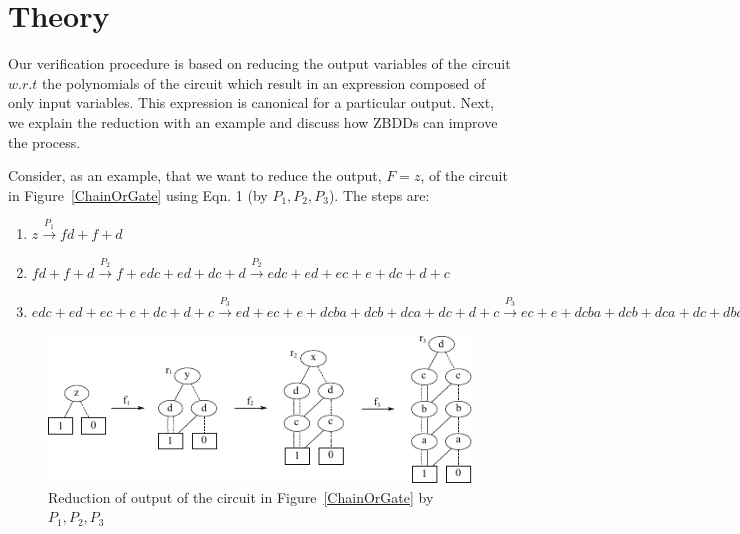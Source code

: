 \documentclass{article}
\theoremstyle{definition}
\begin{document}
\section{Theory}

Our verification procedure is based on reducing the output variables of the circuit $w.r.t$ the polynomials of the circuit which result in an expression composed of only input variables. This expression is canonical for a particular output. Next, we explain the reduction with an example and discuss how ZBDDs can improve the process.
\par
Consider, as an example, that we want to reduce the output, $F=z$, of the circuit in Figure~\ref{ChainOrGate} using Eqn. 1 (by $P_1, P_2, P_3$). The steps are:\\
\begin{enumerate}
\item $z \xrightarrow{P_1} f d +f +d$
\item $fd +f +d \xrightarrow{P_2} f + edc + ed + dc + d \xrightarrow{P_2} edc + ed + ec + e +dc + d + c$
\item $edc + ed + ec + e +dc + d + c \xrightarrow{P_3} ed + ec + e  + dcba  + dcb + dca + dc + d + c \xrightarrow{P_3} ec + e + dcba +dcb + dca + dc + dba + db + da + d + c \xrightarrow{P_3} e  +dcba +dcb + dca + dc + dba + db + da + d + cba + cb + ca + c \xrightarrow{P_3} dcba +dcb + dca + dc + dba + db + da + d + cba + cb + ca + c + ba + b +a$
\end{enumerate}
\begin{figure}
\centering
\includegraphics[scale=1.2]{red_steps.pdf}
\caption{Reduction of output of the circuit in Figure~\ref{ChainOrGate} by $P_1,P_2,P_3$}
\label{red_steps}
\end{figure}

\end{document}
